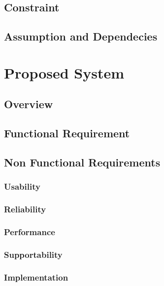 \documentclass[11pt]{article}
\begin{document}
    \subsection{Constraint}

    \subsection{Assumption and Dependecies}



\section{Proposed System}

    \subsection{Overview}

    \subsection{Functional Requirement}

        \subsubsection{}

    \subsection{Non Functional Requirements}
        
        \subsubsection{Usability}
        \subsubsection{Reliability}
        \subsubsection{Performance}
        \subsubsection{Supportability}
        \subsubsection{Implementation}
\end{document}
